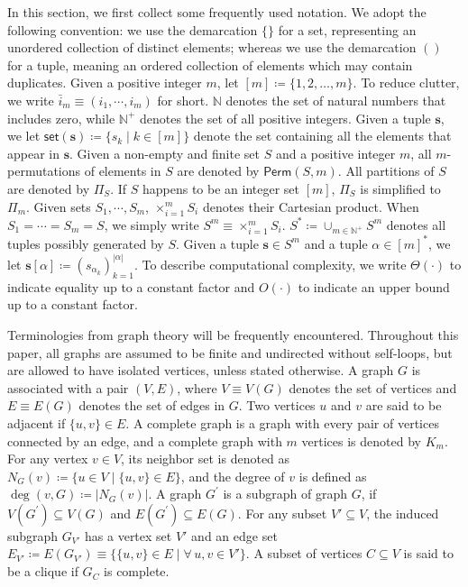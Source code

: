 \documentclass[sn-mathphys, natbib=false]{sn-jnl}
\theoremstyle{plain}
\theoremstyle{definition}
\newcommand{\takesetp}[1]{\mathsf{set}(#1)}
\newcommand{\perm}[1]{\mathsf{Perm}(#1)}
\newcommand{\partition}{\Pi}
\newcommand{\partitionp}[1]{\partition_{#1}}
\newcommand{\degp}[2]{\deg(#1,#2)}
\newcommand{\completegraphp}[1]{K_{#1}}
\newcommand{\less}{O}
\newcommand{\appequal}{\Theta}
\newcommand{\naturals}{\mathbb{N}}
\newcommand{\positivenaturals}{\mathbb{N}^+}
\begin{document}
\begin{bibunit}[agsm]
In this section, we first collect some frequently used notation. We adopt the following convention: we use the demarcation $\{\}$ for a set, representing an unordered collection of distinct elements; whereas we use the demarcation $()$ for a tuple, meaning an ordered collection of elements which may contain duplicates. Given a positive integer $m$, let $[m] \coloneqq \{1, 2, \ldots, m\}$. To reduce clutter, we write $\bar{i}_{m} \equiv (i_{1}, \cdots, i_{m})$ for short. $\naturals$ denotes the set of natural numbers that includes zero, while $\positivenaturals$ denotes the set of all positive integers. Given a tuple $\bm{s}$, we let $\takesetp{\bm{s}} \coloneqq \{s_k \mid k\in [m]\}$ denote the set containing all the elements that appear in $\bm{s}$. Given a non-empty and finite set $S$ and a positive integer $m$, all $m$-permutations of elements in $S$ are denoted by $\perm{S, m}$. All partitions of $S$ are denoted by $\partitionp{S}$. If $S$ happens to be an integer set $[m]$, $\partitionp{S}$ is simplified to $\partitionp{m}$. Given sets $S_{1}, \cdots, S_{m}$, $\times_{i = 1}^{m} S_{i}$ denotes their Cartesian product. When $S_{1} = \cdots = S_{m} = S$, we simply write $S^{m} \equiv \times_{i = 1}^{m} S_{i}$. $S^* \coloneqq \cup_{m \in \positivenaturals} S^m$ denotes all tuples possibly generated by $S$. Given a tuple $\bm{s} \in S^m$ and a tuple $\alpha \in [m]^*$, we let $\bm{s}[\alpha] \coloneqq (s_
{\alpha_k})_{k=1}^{|\alpha|}$. To describe computational complexity, we write $\appequal(\cdot)$ to indicate equality up to a constant factor and $\less(\cdot)$ to indicate an upper bound up to a constant factor.

Terminologies from graph theory will be frequently encountered. Throughout this paper, all graphs are assumed to be finite and undirected without self-loops, but are allowed to have isolated vertices, unless stated otherwise. A graph $G$ is associated with a pair $(V, E)$, where $V \equiv V (G)$ denotes the set of vertices and $E \equiv E (G)$ denotes the set of edges in $G$. Two vertices $u$ and $v$ are said to be adjacent if $\{u, v\} \in E$. A complete graph is a graph with every pair of vertices connected by an edge, and a complete graph with $m$ vertices is denoted by $\completegraphp{m}$. For any vertex $v \in V$, its neighbor set is denoted as $N_G (v) \coloneqq \{ u \in V \mid \{u, v\} \in E \}$, and the degree of $v$ is defined as $\degp{v}{G} \coloneqq |N_G(v)|$. A graph $G^\prime$ is a subgraph of graph $G$, if $V (G^\prime) \subseteq V (G)$ and $E (G^\prime) \subseteq E (G)$. For any subset $V' \subseteq V$, the induced subgraph $G_{V'}$ has a vertex set $V'$ and an edge set $E_{V'} \coloneqq E (G_{V'}) \equiv \{\{u, v\} \in E \mid \forall \, u, v \in V'\}$. A subset of vertices $C \subseteq V$ is said to be a clique if $G_{C}$ is complete.



\end{bibunit}
\end{document}
